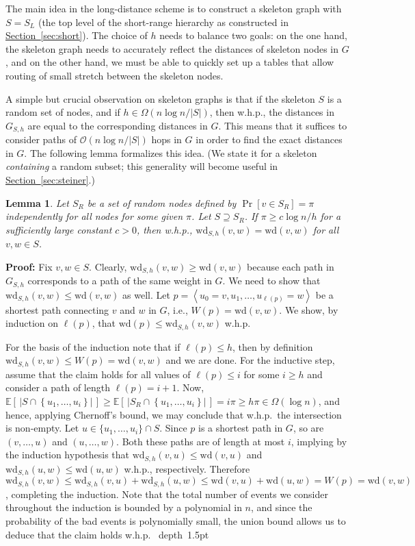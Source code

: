 \documentclass[letterpaper,11pt]{article}
\newcommand{\namedref}[2]{\hyperref[#2]{#1~\ref*{#2}}}
\newcommand{\sectionref}[1]{\namedref{Section}{#1}}
\newtheorem{lemma}[theorem]{Lemma}
\newcommand{\blackslug}{\hbox{\hskip 1pt \vrule width 4pt height 8pt
depth 1.5pt \hskip 1pt}}
\newcommand{\QED}{\quad\blackslug\lower 8.5pt\null\par}
\newenvironment{proof}[1][Proof:]{\noindent \textbf{#1}\xspace}{\QED}
\newcommand{\E}{\mathbb{E}}
\newcommand{\BO}{\mathcal{O}}
\newcommand{\Set}[1]{\left\{ #1 \right\}}
\newcommand{\Seq}[1]{\left\langle #1 \right\rangle}
\newcommand{\Wd}{\mathrm{wd}}
\begin{document}
The main idea in the long-distance scheme is to construct a skeleton
graph with $S=S_L$ (the top level of the short-range hierarchy as constructed in
\sectionref{sec:short}). The choice of $h$ needs to balance two goals: on the one hand, the skeleton graph needs to accurately reflect the
distances of skeleton nodes in $G$, and on the other hand, we must be able to
quickly set up a tables that allow routing of small stretch between the skeleton
nodes.

A simple but crucial observation on skeleton graphs is that if the skeleton $S$
is a random set of nodes, and if $h\in \Omega(n\log n/|S|)$, then w.h.p., the
distances in $G_{S,h}$ are equal to the corresponding distances in $G$. This
means that it suffices to consider paths of $\BO(n\log n/|S|)$ hops in $G$ in
order to find the exact distances in $G$. The following lemma formalizes this
idea. (We state it for a skeleton \emph{containing} a random subset;
this generality will become useful in \sectionref{sec:steiner}.)

\begin{lemma}\label{lemma:distances}
Let $S_R$ be a set of random nodes defined
by $\Pr[v\in S_R]=\pi$ independently for all nodes for some given
$\pi$.
Let $S\supseteq S_R$.
If  $\pi\geq c\log n/h$ for a sufficiently large
constant $c>0$, then w.h.p., $\Wd_{S,h}(v,w)=\Wd(v,w)$ for all $v,w\in S$.
\end{lemma}
\begin{proof}
Fix $v,w\in S$. Clearly, $\Wd_{S,h}(v,w)\geq \Wd(v,w)$ because each
path in $G_{S,h}$ corresponds to a path of the same weight in $G$. We
need to show that $\Wd_{S,h}(v,w)\leq \Wd(v,w)$ as well. Let
$p=\Seq{u_0=v,u_1,\ldots,u_{\ell(p)}=w}$ be a shortest path
connecting $v$ and $w$ in $G$, i.e., $W(p)=\Wd(v,w)$.
We show, by induction on $\ell(p)$, that $\Wd(p)\leq\Wd_{S,h}(v,w)$
w.h.p.

For the basis of the induction note that if $\ell(p)\leq h$, then by definition
$\Wd_{S,h}(v,w)\leq W(p)=\Wd(v,w)$ and we are done. For the inductive step,
assume that the claim holds for all values of $\ell(p)\leq i$ for some $i\ge h$
and consider a path of length $\ell(p)=i+1$. Now, $\E[\,|S\cap
\Set{u_1,\ldots,u_{i}}\!|\,]\geq \E[\,|S_R\cap
\Set{u_1,\ldots,u_{i}}\!|\,]=i\pi\geq h\pi\in\Omega(\log n)$, and hence,
applying Chernoff's bound, we may conclude that w.h.p.\ the intersection is
non-empty. Let $u\in \{u_1,\ldots,u_i\}\cap S$. Since $p$ is a shortest path in
$G$, so are $(v,\ldots,u)$ and $(u,\ldots,w)$. Both these paths are of length at
most $i$, implying by the induction hypothesis that $\Wd_{S,h}(v,u)\leq\Wd(v,u)$
and $\Wd_{S,h}(u,w)\leq\Wd(u,w)$ w.h.p., respectively. Therefore
$\Wd_{S,h}(v,w)\leq \Wd_{S,h}(v,u)+\Wd_{S,h}(u,w)\leq
\Wd(v,u)+\Wd(u,w)=W(p)=\Wd(v,w)$, completing the induction. Note that the total
number of events we consider throughout the induction is bounded by a
polynomial in $n$, and since the probability of the bad events is polynomially
small, the union bound allows us to deduce that the claim holds w.h.p.
\end{proof}
\end{document}
